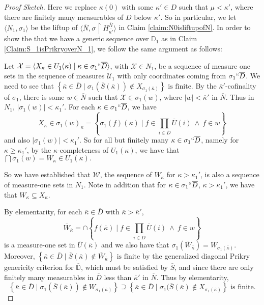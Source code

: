 \documentclass{amsart}
\theoremstyle{definition}
\theoremstyle{remark}
\newcommand{\D}{\mathbb{D}}
\newcommand{\N}{{\overline{N}}}
\renewcommand{\S}{{\overline{S}}}
\newcommand{\U}{\mathcal{U}}
\newcommand{\st}{\; | \;}
\newcommand{\set}[2]{\left\{#1\st #2 \right\}}
\newcommand{\seq}[2]{\langle #1 \st #2 \rangle}
\newcommand{\rest}{\mathbin{\upharpoonright}}
\begin{document}
\begin{proof}[Proof Sketch]
Here we replace $\kappa(0)$ with some $\kappa' \in D$ such that $\mu < \kappa' $, where there are finitely many measurables of $D$ below $\kappa'$. 
So in particular, we let $\langle N_1, \sigma_1 \rangle$ be the liftup of $\langle \N, \sigma \rest H_{\overline{\kappa'}}^\N\rangle$ in Claim \ref{claim:N0isliftupofN}. In order to show the that we have a generic sequence over $\D_1$ as in Claim \ref{Claim:S_1isPrikryoverN_1}, we follow the same argument as follows:

Let $\mathcal X = \seq{ X_\kappa \in U_1(\kappa) }{ \kappa \in \sigma_1``\overline D }$, with $\mathcal X \in N_1$, be a sequence of measure one sets in the sequence of measures $\U_1$ with only coordinates coming from $\sigma_1``\overline D$.
We need to see that 
$\set{ \overline \kappa \in \overline D}{\sigma_1(\S(\overline \kappa)) \notin X_{\sigma_1(\overline \kappa)} }  \text{ is finite.}$
By the $\overline{\kappa}'$-cofinality of $\sigma_1$, there is some $w \in \N$ such that $\mathcal X \in \sigma_1(w)$, where $|w| < \overline{\kappa}'$ in $\N$. Thus in $N_1$, $|\sigma_1(w)| < \kappa_1'$. 
For each $\kappa \in \sigma_1``\overline D$, we have $$\textstyle X_\kappa \in \sigma_1(w)_\kappa = \set{\sigma_1(f)(\kappa) }{ f \in \prod_{i \in \overline D} \overline U(i) \ \land \ f \in w }$$ and also $|\sigma_1(w)|<\kappa_1'.$ So for all but finitely many $\kappa \in \sigma_1``\overline D$, namely for $\kappa \geq \kappa_1'$, by the $\kappa$-completeness of $U_1(\kappa)$, we have that $\bigcap \sigma_1(w)=W_\kappa \in U_1(\kappa).$

So we have established that $\mathcal W$, the sequence of $W_\kappa$ for $\kappa>\kappa_1'$, is also a sequence of measure-one sets in $N_1$. Note in addition that for $\kappa \in \sigma_1``\overline D$, $\kappa> \kappa_1'$, we have that $W_\kappa \subseteq X_\kappa$. 

By elementarity, for each $\overline \kappa \in \overline D$ with $\overline \kappa > \overline \kappa'$, $$\overline W_{\overline \kappa} =\cap \set{f(\overline \kappa) }{ f \in \textstyle\prod_{i \in \overline D} \overline U(i) \ \land \ f \in w }$$ is a measure-one set in $\overline U(\overline \kappa)$ and we also have that $\sigma_1(\overline W_{\overline \kappa}) = W_{\sigma_1(\overline \kappa)}$. Moreover, 
	$\set{\overline \kappa \in \overline D}{\overline S(\overline \kappa) \notin \overline W_{\overline \kappa}} \text{ is finite}$ by the generalized diagonal Prikry genericity criterion for $\overline{\D}$, which must be satisfied by $\overline S$, and since there are only finitely many measurables in $\overline D$ less than $\overline \kappa'$ in $\N$.
Thus by elementarity,
	$$\set{ \overline \kappa \in \overline D }{ \sigma_1(\overline S(\overline \kappa)) \notin W_{\sigma_1(\overline \kappa)} } \supseteq \set{ \overline \kappa \in \overline D }{ \sigma_1(\overline S(\overline \kappa) \notin X_{\sigma_1(\overline \kappa)}} \text{ is finite.}$$


\end{proof}
\end{document}
